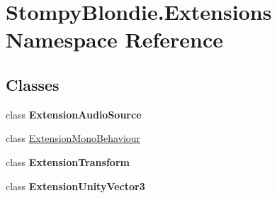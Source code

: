 \hypertarget{namespace_stompy_blondie_1_1_extensions}{}\section{Stompy\+Blondie.\+Extensions Namespace Reference}
\label{namespace_stompy_blondie_1_1_extensions}
\subsection*{Classes}
\begin{DoxyCompactItemize}
\item 
class {\bfseries Extension\+Audio\+Source}
\item 
class \mbox{\hyperlink{class_stompy_blondie_1_1_extensions_1_1_extension_mono_behaviour}{Extension\+Mono\+Behaviour}}
\item 
class {\bfseries Extension\+Transform}
\item 
class {\bfseries Extension\+Unity\+Vector3}
\end{DoxyCompactItemize}
